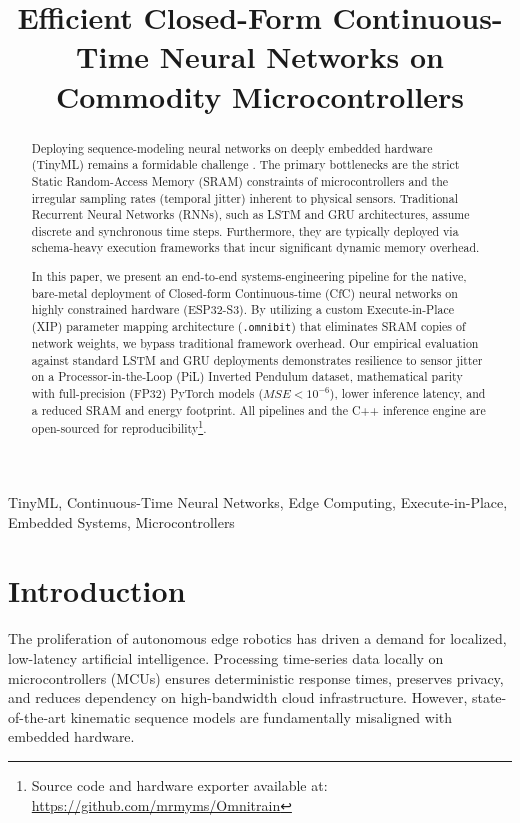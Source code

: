 \documentclass[conference]{IEEEtran}
\begin{document}
\title{Efficient Closed-Form Continuous-Time Neural Networks on Commodity Microcontrollers}

\author{
}

\maketitle

\begin{abstract}
Deploying sequence-modeling neural networks on deeply embedded hardware (TinyML) remains a formidable challenge \cite{ji2020tinyml, gao2021tinytl}. The primary bottlenecks are the strict Static Random-Access Memory (SRAM) constraints of microcontrollers and the irregular sampling rates (temporal jitter) inherent to physical sensors. Traditional Recurrent Neural Networks (RNNs), such as LSTM \cite{hochreiter1997long} and GRU \cite{cho2014learning} architectures, assume discrete and synchronous time steps. Furthermore, they are typically deployed via schema-heavy execution frameworks that incur significant dynamic memory overhead. 

In this paper, we present an end-to-end systems-engineering pipeline for the native, bare-metal deployment of Closed-form Continuous-time (CfC) neural networks on highly constrained hardware (ESP32-S3). By utilizing a custom Execute-in-Place (XIP) parameter mapping architecture (\texttt{.omnibit}) that eliminates SRAM copies of network weights, we bypass traditional framework overhead. Our empirical evaluation against standard LSTM and GRU deployments demonstrates resilience to sensor jitter on a Processor-in-the-Loop (PiL) Inverted Pendulum dataset, mathematical parity with full-precision (FP32) PyTorch models ($MSE < 10^{-6}$), lower inference latency, and a reduced SRAM and energy footprint. All pipelines and the C++ inference engine are open-sourced for reproducibility\footnote{Source code and hardware exporter available at: \url{https://github.com/mrmyms/Omnitrain}}.
\end{abstract}

\begin{IEEEkeywords}
TinyML, Continuous-Time Neural Networks, Edge Computing, Execute-in-Place, Embedded Systems, Microcontrollers
\end{IEEEkeywords}

\section{Introduction}
The proliferation of autonomous edge robotics has driven a demand for localized, low-latency artificial intelligence. Processing time-series data locally on microcontrollers (MCUs) ensures deterministic response times, preserves privacy, and reduces dependency on high-bandwidth cloud infrastructure. However, state-of-the-art kinematic sequence models are fundamentally misaligned with embedded hardware.
\end{document}
